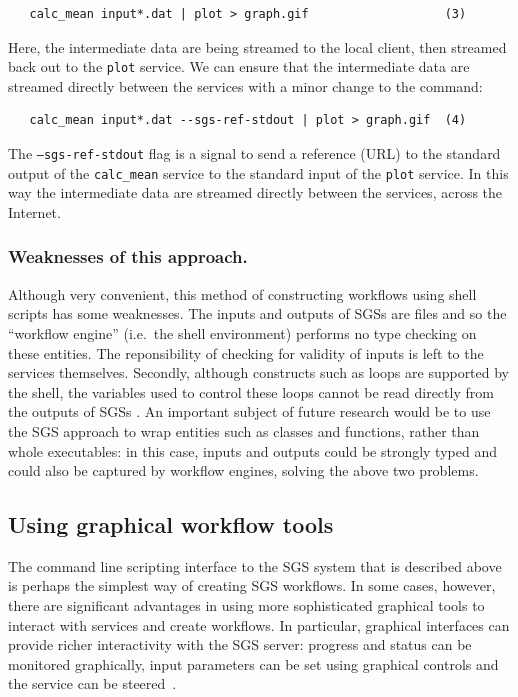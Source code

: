 \documentclass[a4paper]{article}
\begin{document}
\begin{verbatim}
   calc_mean input*.dat | plot > graph.gif                   (3)
\end{verbatim}

Here, the intermediate data are being streamed to the local client, then streamed back out to the \texttt{plot} service.  We can ensure that the intermediate data are streamed directly between the services with a minor change to the command:

\begin{verbatim}
   calc_mean input*.dat --sgs-ref-stdout | plot > graph.gif  (4)
\end{verbatim}

The \texttt{--sgs-ref-stdout} flag is a signal to send a reference (URL) to the standard output of the \texttt{calc\_mean} service to the standard input of the \texttt{plot} service.  In this way the intermediate data are streamed directly between the services, across the Internet.

\subsubsection{Weaknesses of this approach.}
Although very convenient, this method of constructing workflows using shell scripts has some weaknesses.
The inputs and outputs of SGSs are files and so the ``workflow engine'' (i.e.\ the shell environment) performs no type checking on these entities.  The reponsibility of checking for validity of inputs is left to the services themselves.  Secondly, although constructs such as loops are supported by the shell, the variables used to control these loops cannot be read directly from the outputs of SGSs%
.  An important subject of future research would be to use the SGS approach to wrap entities such as classes and functions, rather than whole executables: in this case, inputs and outputs could be strongly typed and could also be captured by workflow engines, solving the above two problems.

\subsection{Using graphical workflow tools}\label{subsec:graphical-workflow}
The command line scripting interface to the SGS system that is described above is perhaps the simplest way of creating SGS workflows.  In some cases, however, there are significant advantages in using more sophisticated graphical tools to interact with services and create workflows.  In particular, graphical interfaces can provide richer interactivity with the SGS server: progress and status can be monitored graphically, input parameters can be set using graphical controls
and the service can be steered~\cite{blower:2005}.
\end{document}
